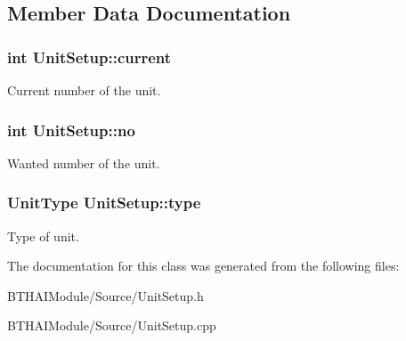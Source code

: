 \subsection{Member Data Documentation}
\hypertarget{class_unit_setup_a4a820e914895b448ad20912421d99ee7}{
\subsubsection[{current}]{\setlength{\rightskip}{0pt plus 5cm}int Unit\-Setup\-::current}}\label{class_unit_setup_a4a820e914895b448ad20912421d99ee7}
Current number of the unit. \hypertarget{class_unit_setup_aed8c7114cbebda909c5ecaed720075a4}{
\subsubsection[{no}]{\setlength{\rightskip}{0pt plus 5cm}int Unit\-Setup\-::no}}\label{class_unit_setup_aed8c7114cbebda909c5ecaed720075a4}
Wanted number of the unit. \hypertarget{class_unit_setup_a6665631fe1080c31e51ac58bd17a9741}{
\subsubsection[{type}]{\setlength{\rightskip}{0pt plus 5cm}Unit\-Type Unit\-Setup\-::type}}\label{class_unit_setup_a6665631fe1080c31e51ac58bd17a9741}
Type of unit. 

The documentation for this class was generated from the following files\-:\begin{DoxyCompactItemize}
\item 
B\-T\-H\-A\-I\-Module/\-Source/Unit\-Setup.\-h\item 
B\-T\-H\-A\-I\-Module/\-Source/Unit\-Setup.\-cpp\end{DoxyCompactItemize}

